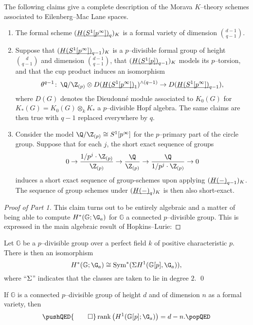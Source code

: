 \begin{theorem}\label{MainKThyOfEMSpacesTheorem}
The following claims give a complete description of the Morava $K$--theory schemes associated to Eilenberg--Mac Lane spaces.
\begin{enumerate}
    \item The formal scheme $(\underline{\smash{H(S^1[p^\infty])}}_{q})_K$ is a formal variety of dimension $\binom{d-1}{q-1}$.
    \item Suppose that $(\underline{\smash{H(S^1[p^\infty])}}_{q-1})_K$ is a $p$--divisible formal group of height $\binom{d}{q-1}$ and dimension $\binom{d-1}{q-1}$, that $(\underline{\smash{H(S^1[p])}}_{q-1})_K$ models its $p$--torsion, and that the cup product induces an isomorphism \[\theta^{q-1}\co \Q / \Z_{(p)} \otimes D(\OS{H(S^1[p^\infty])}{1})^{\wedge (q-1)} \to D(\OS{H(S^1[p^\infty])}{q-1}),\] where $D(G)$ denotes the Dieudonn\'e module associated to $K_0(G)$ for $K_*(G) = K_0(G) \otimes_k K_*$ a $p$--divisible Hopf algebra.  The same claims are then true with $q-1$ replaced everywhere by $q$.
    \item Consider the model $\Q / \Z_{(p)} \cong S^1[p^\infty]$ for the $p$--primary part of the circle group.  Suppose that for each $j$, the short exact sequence of groups \[0 \to \frac{1/p^j \cdot \Z_{(p)}}{\Z_{(p)}} \to \frac{\Q}{\Z_{(p)}} \to \frac{\Q}{1/p^j \cdot \Z_{(p)}} \to 0\] induces a short exact sequence of group-schemes upon applying $(\underline{\smash{H(-)}}_{q-1})_K$.  The sequence of group schemes under $(\underline{\smash{H(-)}}_{q})_K$ is then also short-exact.
\end{enumerate}
\end{theorem}
\begin{proof}[Proof of Part 1]\renewcommand{\qedsymbol}{\relax}
This claim turns out to be entirely algebraic and a matter of being able to compute $H^*(\mathbb G; \G_a)$ for $\mathbb G$ a connected $p$--divisible group.  This is expressed in the main algebraic result of Hopkins--Lurie:
\end{proof}

\begin{theorem}
Let $\mathbb G$ be a $p$--divisible group over a perfect field $k$ of positive characteristic $p$.  There is then an isomorphism \[H^*(\mathbb G; \G_a) \cong \Sym^*(\Susp H^1(\mathbb G[p], \G_a)),\] where ``$\Sigma$'' indicates that the classes are taken to lie in degree $2$. \qed
\end{theorem}

\begin{lemma}
If $\mathbb G$ is a connected $p$--divisible group of height $d$ and of dimension $n$ as a formal variety, then
\[\pushQED{\qed}
\operatorname{rank}\left(H^1(\mathbb G[p]; \G_a)\right) = d - n. \qedhere
\popQED\]
\end{lemma}

